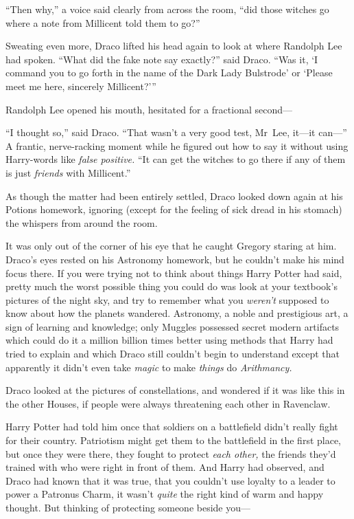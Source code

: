 “Then why,” a voice said clearly from across the room, “did those witches go
where a note from Millicent told them to go?”

Sweating even more, Draco lifted his head again to look at where Randolph Lee
had spoken. “What did the fake note say exactly?” said Draco. “Was it, ‘I
command you to go forth in the name of the Dark Lady Bulstrode’ or ‘Please meet
me here, sincerely Millicent?’”

Randolph Lee opened his mouth, hesitated for a fractional second—

“I thought so,” said Draco. “That wasn’t a very good test, Mr~Lee, it—it
can—” A frantic, nerve-racking moment while he figured out how to say it
without using Harry-words like \emph{false positive.} “It can get the witches
to go there if any of them is just \emph{friends} with Millicent.”

As though the matter had been entirely settled, Draco looked down again at his
Potions homework, ignoring (except for the feeling of sick dread in his
stomach) the whispers from around the room.

It was only out of the corner of his eye that he caught Gregory staring at him.
\later
Draco’s eyes rested on his Astronomy homework, but he couldn’t make his mind
focus there. If you were trying not to think about things Harry Potter had
said, pretty much the worst possible thing you could do was look at your
textbook’s pictures of the night sky, and try to remember what you \emph{weren’t}
supposed to know about how the planets wandered. Astronomy, a noble
and prestigious art, a sign of learning and knowledge; only Muggles possessed
secret modern artifacts which could do it a million billion times better using
methods that Harry had tried to explain and which Draco still couldn’t begin to
understand except that apparently it didn’t even take \emph{magic} to make
\emph{things} do \emph{Arithmancy.}

Draco looked at the pictures of constellations, and wondered if it was like
this in the other Houses, if people were always threatening each other in
Ravenclaw.

Harry Potter had told him once that soldiers on a battlefield didn’t really
fight for their country. Patriotism might get them to the battlefield in the
first place, but once they were there, they fought to protect \emph{each
other,} the friends they’d trained with who were right in front of them. And
Harry had observed, and Draco had known that it was true, that you couldn’t use
loyalty to a leader to power a Patronus Charm, it wasn’t \emph{quite} the right
kind of warm and happy thought. But thinking of protecting someone beside you—

